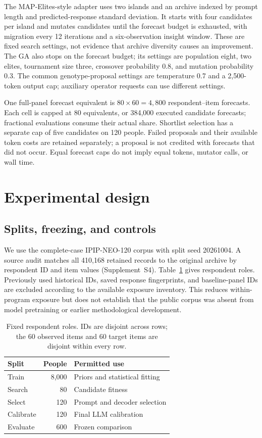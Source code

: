 \documentclass[10pt,twocolumn]{article}
\newcommand{\ArchivalApp}{Supplement~S4}
\begin{document}
The MAP-Elites-style adapter uses two islands and an archive indexed by
prompt length and predicted-response standard deviation. It starts with four
candidates per island and mutates candidates until the forecast budget is
exhausted, with migration every 12 iterations and a six-observation insight
window. These are fixed search settings, not evidence that archive diversity
causes an improvement. The GA also stops on the forecast budget; its settings
are population eight, two elites, tournament
size three, crossover probability 0.8, and mutation probability 0.3.
The common genotype-proposal settings are temperature 0.7 and a 2,500-token
output cap; auxiliary operator requests can use different settings.

One full-panel forecast equivalent is $80\times60=4{,}800$ respondent--item
forecasts. Each cell is capped at 80 equivalents, or 384,000 executed
candidate forecasts; fractional evaluations consume their actual share.
Shortlist selection has a separate cap of five candidates on 120 people.
Failed proposals and their available token costs are retained separately;
a proposal is not credited with forecasts that did not occur. Equal forecast
caps do not imply equal tokens, mutator calls, or wall time.

\section{Experimental design}\label{sec:controls}
\subsection{Splits, freezing, and controls}
We use the complete-case IPIP-NEO-120 corpus with split seed 20261004.
A source audit matches all 410,168 retained records to the original archive
by respondent ID and item values (\ArchivalApp). Table~\ref{tab:splits} gives respondent roles. Previously
used historical IDs, saved response fingerprints, and baseline-panel IDs are
excluded according to the available exposure inventory. This reduces
within-program exposure but does not establish that the public corpus was
absent from model pretraining or earlier methodological development.

\begin{table}[t]
\caption{Fixed respondent roles. IDs are disjoint across rows; the 60 observed
items and 60 target items are disjoint within every row.}
\label{tab:splits}\centering\small
\begin{tabular}{@{}lrl@{}}\toprule
Split & People & Permitted use\\\midrule
Train & 8,000 & Priors and statistical fitting\\
Search & 80 & Candidate fitness\\
Select & 120 & Prompt and decoder selection\\
Calibrate & 120 & Final LLM calibration\\
Evaluate & 600 & Frozen comparison\\\bottomrule
\end{tabular}
\end{table}
\end{document}
